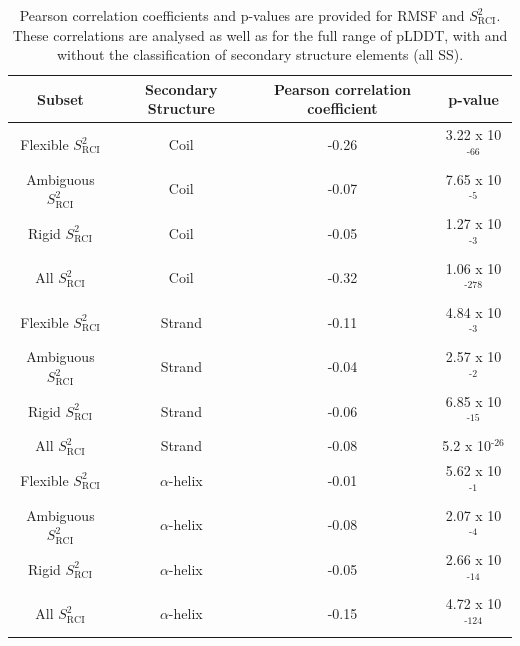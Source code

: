 \begin{table}[H]
\centering
\small
\caption{Pearson correlation coefficients and p-values are provided for RMSF and $S_{\text{RCI}}^{2}$. These correlations are analysed as well as for the full range of pLDDT, with and without the classification of secondary structure elements (all SS).}
\label{tab:plddt_sup:suptable8}
\begin{tabular}{cccc}
\toprule
\multicolumn{1}{c}{Subset} & \multicolumn{1}{c}{Secondary Structure} & \multicolumn{1}{c}{Pearson correlation coefficient} & \multicolumn{1}{c}{p-value}  \\ \hline
Flexible $S_{\text{RCI}}^{2}$  & Coil                & -0.26                       & 3.22 x 10$^{\text{-66}}$     \\
Ambiguous $S_{\text{RCI}}^{2}$ & Coil                & -0.07                       & 7.65 x 10$^{\text{-5}}$      \\
Rigid $S_{\text{RCI}}^{2}$     & Coil                & -0.05                       & 1.27 x 10$^{\text{-3}}$      \\
All $S_{\text{RCI}}^{2}$       & Coil                & -0.32                       & 1.06 x 10$^{\text{-278}}$    \\
\arrayrulecolor[gray]{0.8}\hline
Flexible $S_{\text{RCI}}^{2}$  & Strand              & -0.11                       & 4.84 x 10$^{\text{-3}}$      \\
Ambiguous $S_{\text{RCI}}^{2}$ & Strand              & -0.04                       & 2.57 x 10$^{\text{-2}}$      \\
Rigid $S_{\text{RCI}}^{2}$     & Strand              & -0.06                       & 6.85 x 10$^{\text{-15}}$     \\
All $S_{\text{RCI}}^{2}$       & Strand              & -0.08                       & 5.2 x 10$^{\text{-26}}$      \\
\arrayrulecolor[gray]{0.8}\hline
Flexible $S_{\text{RCI}}^{2}$  & $\alpha$-helix      & -0.01                       & 5.62 x 10$^{\text{-1}}$      \\
Ambiguous $S_{\text{RCI}}^{2}$ & $\alpha$-helix      & -0.08                       & 2.07 x 10$^{\text{-4}}$      \\
Rigid $S_{\text{RCI}}^{2}$     & $\alpha$-helix      & -0.05                       & 2.66 x 10$^{\text{-14}}$     \\
All $S_{\text{RCI}}^{2}$       & $\alpha$-helix      & -0.15                       & 4.72 x 10$^{\text{-124}}$    \\

\end{tabular}
\end{table}
